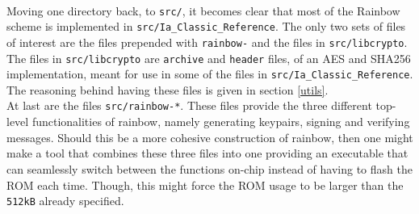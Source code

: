 \medskip\\
Moving one directory back, to \texttt{src/}, it becomes clear that most of the Rainbow scheme is implemented in \texttt{src/Ia\_Classic\_Reference}. The only two sets of files of interest are the files prepended with \texttt{rainbow-} and the files in \texttt{src/libcrypto}. The files in \texttt{src/libcrypto} are \texttt{archive} and \texttt{header} files, of an AES and SHA256 implementation, meant for use in some of the files in \texttt{src/Ia\_Classic\_Reference}. The reasoning behind having these files is given in section \ref{utils}.\medskip\\
At last are the files \texttt{src/rainbow-*}. These files provide the three different top-level functionalities of rainbow, namely generating keypairs, signing and verifying messages. Should this be a more cohesive construction of rainbow, then one might make a tool that combines these three files into one providing an executable that can seamlessly switch between the functions on-chip instead of having to flash the ROM each time. Though, this might force the ROM usage to be larger than the \texttt{512kB} already specified.

